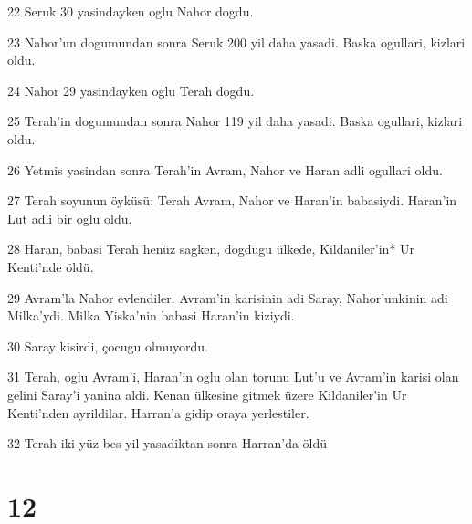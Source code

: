 \par 22 Seruk 30 yasindayken oglu Nahor dogdu.
\par 23 Nahor'un dogumundan sonra Seruk 200 yil daha yasadi. Baska ogullari, kizlari oldu.
\par 24 Nahor 29 yasindayken oglu Terah dogdu.
\par 25 Terah'in dogumundan sonra Nahor 119 yil daha yasadi. Baska ogullari, kizlari oldu.
\par 26 Yetmis yasindan sonra Terah'in Avram, Nahor ve Haran adli ogullari oldu.
\par 27 Terah soyunun öyküsü: Terah Avram, Nahor ve Haran'in babasiydi. Haran'in Lut adli bir oglu oldu.
\par 28 Haran, babasi Terah henüz sagken, dogdugu ülkede, Kildaniler'in* Ur Kenti'nde öldü.
\par 29 Avram'la Nahor evlendiler. Avram'in karisinin adi Saray, Nahor'unkinin adi Milka'ydi. Milka Yiska'nin babasi Haran'in kiziydi.
\par 30 Saray kisirdi, çocugu olmuyordu.
\par 31 Terah, oglu Avram'i, Haran'in oglu olan torunu Lut'u ve Avram'in karisi olan gelini Saray'i yanina aldi. Kenan ülkesine gitmek üzere Kildaniler'in Ur Kenti'nden ayrildilar. Harran'a gidip oraya yerlestiler.
\par 32 Terah iki yüz bes yil yasadiktan sonra Harran'da öldü

\chapter{12}

